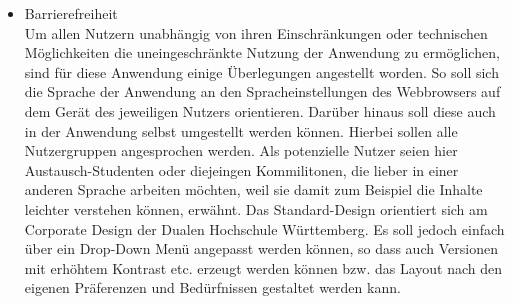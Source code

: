 \begin{itemize}
   	\item Barrierefreiheit		\\
   		Um allen Nutzern unabhängig von ihren Einschränkungen oder technischen Möglichkeiten die uneingeschränkte Nutzung der Anwendung zu ermöglichen, sind für diese Anwendung einige Überlegungen angestellt worden. So soll sich die Sprache der Anwendung an den Spracheinstellungen des Webbrowsers auf dem Gerät des jeweiligen Nutzers orientieren. Darüber hinaus soll diese auch in der Anwendung selbst umgestellt werden können. Hierbei sollen alle Nutzergruppen angesprochen werden. Als potenzielle Nutzer seien hier Austausch-Studenten oder diejeingen Kommilitonen, die lieber in einer anderen Sprache arbeiten möchten, weil sie damit zum Beispiel die Inhalte leichter verstehen können, erwähnt. Das Standard-Design orientiert sich am Corporate Design der Dualen Hochschule Württemberg. Es soll jedoch einfach über ein Drop-Down Menü angepasst werden können, so dass auch Versionen mit erhöhtem Kontrast etc. erzeugt werden können bzw. das Layout nach den eigenen Präferenzen und Bedürfnissen gestaltet werden kann.
\end{itemize}



